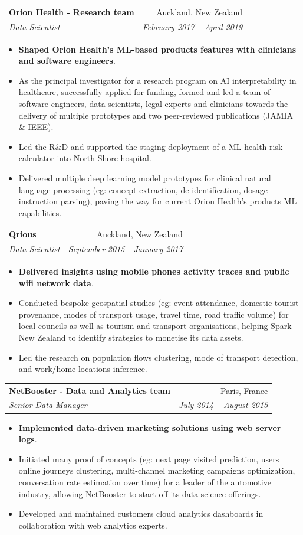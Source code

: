 \documentclass[letterpaper,11pt]{article}
\makeatletter
\newcommand{\resumeItemBis}[2]{
  \item\small{
    \textbf{#1}{#2 \vspace{-2pt}}
  }
}
\newcommand{\resumeSubheading}[4]{
  \vspace{-1pt}\item
    \begin{tabular*}{0.97\textwidth}[t]{l@{\extracolsep{\fill}}r}
      \textbf{#1} & #2 \\
      \textit{\small#3} & \textit{\small #4} \\
    \end{tabular*}\vspace{-5pt}
}
\newcommand{\resumeItemListStart}{\begin{itemize}}
\newcommand{\resumeItemListEnd}{\end{itemize}\vspace{-5pt}}
\makeatother
\begin{document}
    \resumeSubheading
      {Orion Health - Research team}{Auckland, New Zealand}
      {Data Scientist}{February 2017 -- April 2019}
      \resumeItemListStart
        \resumeItemBis{Shaped Orion Health's ML-based products features with clinicians and software engineers}{.}
        \resumeItemBis{} {As the principal investigator for a research program on AI interpretability in healthcare, successfully applied for funding, formed and led a team of software engineers, data scientists, legal experts and clinicians towards the delivery of multiple prototypes and two peer-reviewed publications (JAMIA \& IEEE).}
        \resumeItemBis{} {Led the R\&D and supported the staging deployment of a ML health risk calculator into North Shore hospital.}
        \resumeItemBis{} {Delivered multiple deep learning model prototypes for clinical natural language processing (eg: concept extraction, de-identification, dosage instruction parsing), paving the way for current Orion Health's products ML capabilities.}
      \resumeItemListEnd

    \resumeSubheading
      {Qrious}{Auckland, New Zealand}
      {Data Scientist}{September 2015 - January 2017}
      \resumeItemListStart
        \resumeItemBis{Delivered insights using mobile phones activity traces and public wifi network data}{.}
        \resumeItemBis{} {Conducted bespoke geospatial studies (eg: event attendance, domestic tourist provenance, modes of transport usage, travel time, road traffic volume) for local councils as well as tourism and transport organisations, helping Spark New Zealand to identify strategies to monetise its data assets.}
        \resumeItemBis{} {Led the research on population flows clustering, mode of transport detection, and work/home locations inference.}
      \resumeItemListEnd

    \resumeSubheading
      {NetBooster - Data and Analytics team}{Paris, France}
      {Senior Data Manager}{July 2014 -- August 2015}
        \resumeItemListStart
        \resumeItemBis{Implemented data-driven marketing solutions using web server logs}{.}
        \resumeItemBis{} {Initiated many proof of concepts (eg: next page visited prediction, users online journeys clustering, multi-channel marketing campaigns optimization, conversation rate estimation over time) for a leader of the automotive industry, allowing NetBooster to start off its data science offerings.} 
        \resumeItemBis{} {Developed and maintained customers cloud analytics dashboards in collaboration with web analytics experts.}
      \resumeItemListEnd
\end{document}
